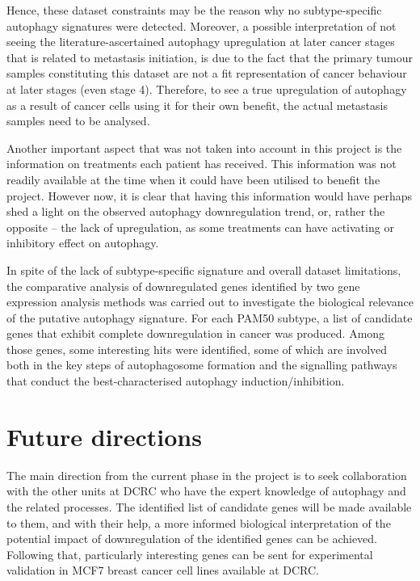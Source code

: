 Hence, these dataset constraints may be the reason why no subtype-specific autophagy signatures were detected. Moreover, a possible interpretation of not seeing the literature-ascertained autophagy upregulation at later cancer stages that is related to metastasis initiation, is due to the fact that the primary tumour samples constituting this dataset are not a fit representation of cancer behaviour at later stages (even stage 4). Therefore, to see a true upregulation of autophagy as a result of cancer cells using it for their own benefit, the actual metastasis samples need to be analysed. 

\newpage
Another important aspect that was not taken into account in this project is the information on treatments each patient has received. This information was not readily available at the time when it could have been utilised to benefit the project. However now, it is clear that having this information would have perhaps shed a light on the observed autophagy downregulation trend, or, rather the opposite -- the lack of upregulation, as some treatments can have activating or inhibitory effect on autophagy. 

In spite of the lack of subtype-specific signature and overall dataset limitations, the comparative analysis of downregulated genes identified by two gene expression analysis methods was carried out to investigate the biological relevance of the putative autophagy signature. For each PAM50 subtype, a list of candidate genes that exhibit complete downregulation in cancer was produced. Among those genes, some interesting hits were identified, some of which are involved both in the key steps of autophagosome formation  and the signalling pathways that conduct the best-characterised autophagy induction/inhibition. 

\section{Future directions}

The main direction from the current phase in the project is to seek collaboration with the other units at DCRC who have the expert knowledge of autophagy and the related processes.  The identified list of candidate genes will be made available to them, and with their help, a more informed biological interpretation of the potential impact of downregulation of the identified genes can be achieved. Following that, particularly interesting genes can be sent for experimental validation in MCF7 breast cancer cell lines available at DCRC.

